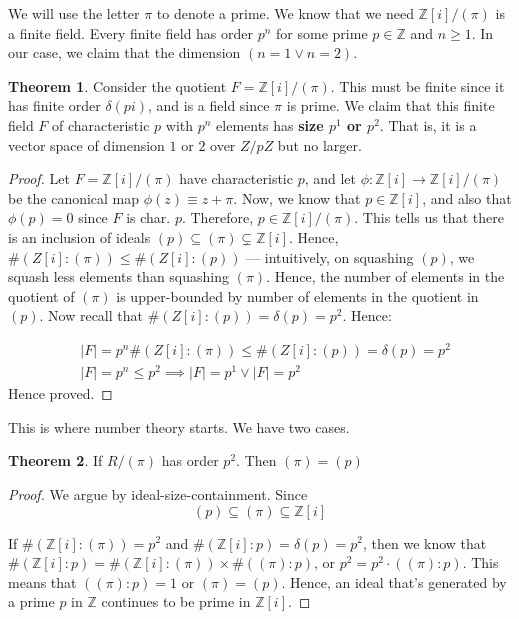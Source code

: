 \documentclass{book}
\newcommand{\Z}{\ensuremath{\mathbb{Z}}}
\theoremstyle{definition}
\newtheorem{theorem}{Theorem}
\begin{document}
We will use the letter $\pi$ to denote a prime. We know that we need $\Z[i] / (\pi)$
is a finite field. Every finite field has order $p^n$ for some prime $p \in \Z$
and $n \geq 1$. In our case, we claim that the dimension $(n = 1 \lor n = 2)$.
\begin{theorem}
Consider the quotient $F = \Z[i]/ (\pi)$. This must be finite since it has finite order $\delta(pi)$,
and is a field since $\pi$ is prime. We claim that this finite field $F$ of
characteristic $p$ with $p^n$ elements has \textbf{size $p^1$ or $p^2$}. That is,
it is a vector space of dimension $1$ or $2$ over $Z/pZ$ but no larger.
\end{theorem}
\begin{proof}
Let $F = \Z[i]/(\pi)$ have characteristic $p$, and let $\phi: \Z[i] \rightarrow \Z[i]/(\pi)$
be the canonical map $\phi(z) \equiv z + \pi$. Now, we know that $p \in \Z[i]$,
and also that $\phi(p) = 0$ since $F$ is char. $p$. Therefore, $p \in \Z[i]/(\pi)$.
This tells us that there is an inclusion of ideals $(p) \subseteq (\pi) \subsetneq \Z[i]$.
Hence, $\#(Z[i]:(\pi)) \leq \#(Z[i]:(p))$ --- intuitively, on squashing $(p)$,
we squash less elements than squashing $(\pi)$. Hence, the number of elements
in the quotient of $(\pi)$ is upper-bounded by number of elements in the
quotient in $(p)$. Now recall that $\#(Z[i]:(p)) = \delta(p) = p^2$. Hence:

\begin{align*}
&|F| = p^n \#(Z[i]:(\pi)) \leq \#(Z[i]:(p)) = \delta(p) = p^2 \\
&|F| = p^n \leq p^2 \implies |F| = p^1 \lor |F| = p^2
\end{align*}
Hence proved.
\end{proof}

This is where number theory starts. We have two cases. 

\begin{theorem}
If $R/(\pi)$ has order $p^2$. Then $(\pi) = (p)$
\end{theorem}
\begin{proof}
We argue by ideal-size-containment. Since 
$$
(p) \subseteq (\pi) \subseteq \Z[i]
$$

If $\#(\Z[i]:(\pi)) = p^2$ and $\#(\Z[i]:p) = \delta(p) = p^2$, then we know
that $\#(\Z[i]:p) = \#(\Z[i]:(\pi)) \times \#((\pi):p)$, or $p^2 = p^2 \cdot ((\pi):p)$.
This means that $((\pi):p) = 1$ or $(\pi) = (p)$. Hence, an ideal that's generated
by a prime $p$ in $\Z$ continues to be prime in $\Z[i]$.
\end{proof}
\end{document}
